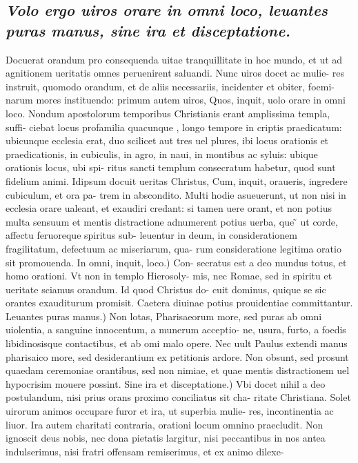 \documentclass{article}
\begin{document}
\begin{pages}
\subsection*{\textit{Volo ergo uiros orare in omni loco, leuantes puras manus, sine ira et disceptatione. }}\pstart Docuerat orandum pro consequenda uitae tranquillitate in hoc mundo, et ut ad agnitionem ueritatis omnes peruenirent saluandi. Nunc uiros docet ac mulie- res instruit, quomodo orandum, et de aliis necessariis, incidenter et obiter, foemi- narum mores instituendo: primum autem uiros, Quos, inquit, uolo orare in omni loco. Nondum apostolorum temporibus Christianis erant amplissima templa, suffi- ciebat locus profamilia quacunque , longo tempore in criptis praedicatum: ubicunque  ecclesia erat, duo scilicet aut tres uel plures, ibi locus orationis et praedicationis, in cubiculis, in agro, in naui, in montibus ac syluis: ubique orationis locus, ubi spi- ritus sancti templum consecratum habetur, quod sunt fidelium animi. Idipsum docuit ueritas Christus, Cum, inquit, oraueris, ingredere cubiculum, et ora pa- trem in abscondito. Multi hodie asueuerunt, ut non nisi in ecclesia orare ualeant, et exaudiri credant: si tamen uere orant, et non potius multa sensuum et mentis distractione adnumerent potius uerba, que ̃ ut corde, affectu feruoreque spiritus sub- leuentur in deum, in considerationem fragilitatum, defectuum ac miseriarum, qua- rum consideratione legitima oratio sit promouenda. In omni, inquit, loco.) Con- secratus est a deo mundus totus, et homo orationi. Vt non in templo Hierosoly- mis, nec Romae, sed in spiritu et ueritate sciamus orandum. Id quod Christus do- cuit dominus, quique se sic orantes exauditurum promisit. Caetera diuinae potius prouidentiae committantur. Leuantes puras manus.) Non lotas, Pharisaeorum more, sed puras ab omni uiolentia, a sanguine innocentum, a munerum acceptio- ne, usura, furto, a foedis libidinosisque contactibus, et ab omi malo opere. Nec uult Paulus extendi manus pharisaico more, sed desiderantium ex petitionis ardore. Non obsunt, sed prosunt quaedam ceremoniae orantibus, sed non nimiae, et quae mentis distractionem uel hypocrisim mouere possint. Sine ira et disceptatione.) Vbi docet nihil a deo postulandum, nisi prius orans proximo conciliatus sit cha- ritate Christiana. Solet uirorum animos occupare furor et ira, ut superbia mulie- res, incontinentia ac liuor. Ira autem charitati contraria, orationi locum omnino praecludit. Non ignoscit deus nobis, nec dona pietatis largitur, nisi peccantibus in nos antea indulserimus, nisi fratri offensam remiserimus, et ex animo dilexe-  \pend

\end{pages}
\end{document}
